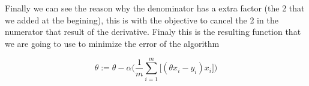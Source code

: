 \documentclass[12pt,journal]{IEEEtran}
\begin{document}
    Finally we can see the reason why the denominator has a extra factor
    (the 2 that we added at the begining), this is with the objective
    to cancel the 2 in the numerator that result of the derivative. Finaly
    this is the resulting function that we are going to use to minimize the
    error of the algorithm

    \begin{equation}
        \theta := \theta - \alpha
            \Bigg(
                \frac{1}{m} \sum_{i=1}^{m}
                    \Big[
                        (\theta x_i - y_i) x_i
                    \Big]
            \Bigg)
    \end{equation}
\end{document}
